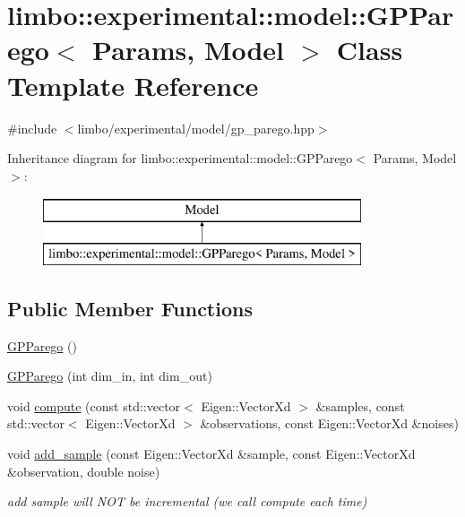 \hypertarget{classlimbo_1_1experimental_1_1model_1_1_g_p_parego}{}\section{limbo\+:\+:experimental\+:\+:model\+:\+:G\+P\+Parego$<$ Params, Model $>$ Class Template Reference}
\label{classlimbo_1_1experimental_1_1model_1_1_g_p_parego}


{\ttfamily \#include $<$limbo/experimental/model/gp\+\_\+parego.\+hpp$>$}

Inheritance diagram for limbo\+:\+:experimental\+:\+:model\+:\+:G\+P\+Parego$<$ Params, Model $>$\+:\begin{figure}[H]
\begin{center}
\leavevmode
\includegraphics[height=2.000000cm]{classlimbo_1_1experimental_1_1model_1_1_g_p_parego}
\end{center}
\end{figure}
\subsection*{Public Member Functions}
\begin{DoxyCompactItemize}
\item 
\hyperlink{classlimbo_1_1experimental_1_1model_1_1_g_p_parego_ac351d6798add22da5c6dd58ac4a00723}{G\+P\+Parego} ()
\item 
\hyperlink{classlimbo_1_1experimental_1_1model_1_1_g_p_parego_a1f0eb578140f01874b13bfca124c085c}{G\+P\+Parego} (int dim\+\_\+in, int dim\+\_\+out)
\item 
void \hyperlink{classlimbo_1_1experimental_1_1model_1_1_g_p_parego_ae361cd8b8831e4364774dfdd05937617}{compute} (const std\+::vector$<$ Eigen\+::\+Vector\+Xd $>$ \&samples, const std\+::vector$<$ Eigen\+::\+Vector\+Xd $>$ \&observations, const Eigen\+::\+Vector\+Xd \&noises)
\item 
void \hyperlink{classlimbo_1_1experimental_1_1model_1_1_g_p_parego_a81955696f79b4ac11a17d0faf28ccc31}{add\+\_\+sample} (const Eigen\+::\+Vector\+Xd \&sample, const Eigen\+::\+Vector\+Xd \&observation, double noise)
\begin{DoxyCompactList}\small\item\em add sample will N\+OT be incremental (we call compute each time) \end{DoxyCompactList}\end{DoxyCompactItemize}


